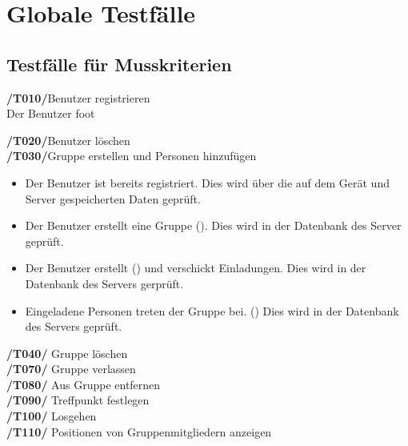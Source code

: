 \section{Globale Testfälle}
\subsection{Testfälle für Musskriterien}
\textbf{/T010/}\quad Benutzer registrieren \\
Der Benutzer foot

\textbf{/T020/}\quad Benutzer löschen \\


\textbf{/T030/}\quad Gruppe erstellen und Personen hinzufügen \\
\begin{itemize}
\setlength{\itemsep}{0pt}
\item Der Benutzer ist bereits registriert. Dies wird über die auf dem Gerät
und Server gespeicherten Daten geprüft.
\item Der Benutzer erstellt eine Gruppe (). Dies wird in der Datenbank des Server geprüft.
\item Der Benutzer erstellt () und verschickt Einladungen. Dies wird in der Datenbank des Servers gerprüft.
\item Eingeladene Personen treten der Gruppe bei. () Dies wird in der Datenbank des Servers geprüft.
\end{itemize}

\textbf{/T040/} Gruppe löschen \\
\textbf{/T070/} Gruppe verlassen \\
\textbf{/T080/} Aus Gruppe entfernen \\
\textbf{/T090/} Treffpunkt festlegen \\
\textbf{/T100/} Losgehen \\ %
\textbf{/T110/} Positionen von Gruppenmitgliedern anzeigen \\

